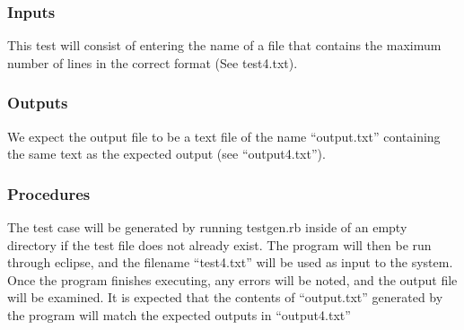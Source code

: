 \documentclass[]{article}
\begin{document}
	\subsubsection{Inputs}
	This test will consist of entering the name of a file that contains the maximum
	number of lines in the correct format (See test4.txt).
	
	\subsubsection{Outputs}
	We expect the output file to be a text file of the name ``output.txt''
	containing the same text as the expected output (see ``output4.txt'').
	
	\subsubsection{Procedures}
	The test case will be generated by running testgen.rb inside of an empty
	directory if the test file does not already exist.  The program will then be
	run through eclipse, and the filename ``test4.txt'' will be used as input to
	the system.  Once the program finishes executing, any errors will be noted, and
	the output file will be examined.  It is expected that the contents of
	``output.txt'' generated by the program will match the expected outputs in
	``output4.txt''
	


\end{document}
